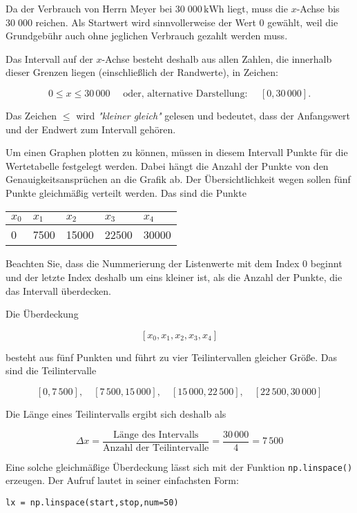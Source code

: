 \documentclass[11pt]{article}
\begin{document}
    Da der Verbrauch von Herrn Meyer bei \(30\;000\,\mathrm{kWh}\) liegt,
muss die \(x\)-Achse bis \(30\;000\) reichen. Als Startwert wird
sinnvollerweise der Wert \(0\) gewählt, weil die Grundgebühr auch ohne
jeglichen Verbrauch gezahlt werden muss.

Das Intervall auf der \(x\)-Achse besteht deshalb aus allen Zahlen, die
innerhalb dieser Grenzen liegen (einschließlich der Randwerte), in
Zeichen:

\[0 \le x \le 30\,000 \quad\text{ oder, alternative Darstellung: }\quad [0,30\,000].\]

    Das Zeichen \(\le\) wird \emph{"kleiner gleich"} gelesen und bedeutet,
dass der Anfangswert und der Endwert zum Intervall gehören.

Um einen Graphen plotten zu können, müssen in diesem Intervall Punkte
für die Wertetabelle festgelegt werden. Dabei hängt die Anzahl der
Punkte von den Genauigkeitsansprüchen an die Grafik ab. Der
Übersichtlichkeit wegen sollen fünf Punkte gleichmäßig verteilt werden.
Das sind die Punkte

\begin{longtable}[]{@{}lllll@{}}
\toprule
\(x_0\) & \(x_1\) & \(x_2\) & \(x_3\) & \(x_4\)\tabularnewline
\midrule
\endhead
0 & 7500 & 15000 & 22500 & 30000\tabularnewline
\bottomrule
\end{longtable}

    Beachten Sie, dass die Nummerierung der Listenwerte mit dem Index 0
beginnt und der letzte Index deshalb um eins kleiner ist, als die Anzahl
der Punkte, die das Intervall überdecken.

    Die Überdeckung

\[[x_0, x_1, x_2, x_3, x_4]\]

besteht aus fünf Punkten und führt zu vier Teilintervallen gleicher
Größe. Das sind die Teilintervalle

\[
  [0,7\,500],\quad [7\,500,15\,000],\quad [15\,000,22\,500],\quad [22\,500,30\,000]
\]

Die Länge eines Teilintervalls ergibt sich deshalb als

\[
  \Delta x = \dfrac{\text{Länge des Intervalls}}{\text{Anzahl der Teilintervalle}}
           = \dfrac{30\,000}{4}
           = 7\,500
\]

    Eine solche gleichmäßige Überdeckung lässt sich mit der Funktion
\texttt{np.linspace()} erzeugen. Der Aufruf lautet in seiner einfachsten
Form:

\texttt{lx\ =\ np.linspace(start,stop,num=50)}
\end{document}
